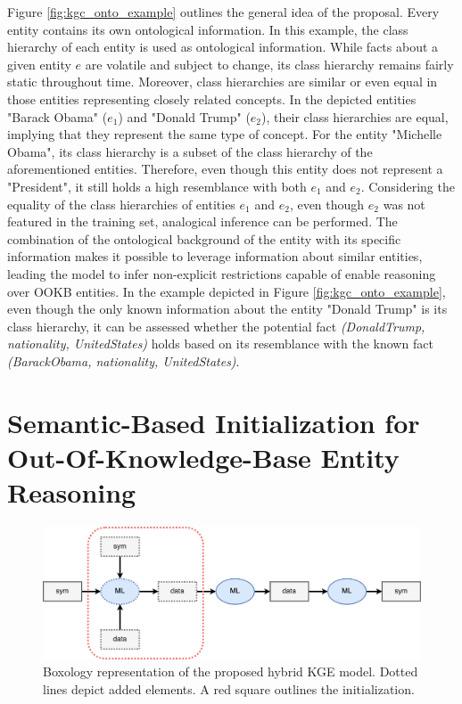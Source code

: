 Figure \ref{fig:kgc_onto_example} outlines the general idea of the proposal. Every entity contains its own ontological information. In this example, the class hierarchy of each entity is used as ontological information. While facts about a given entity $e$ are volatile and subject to change, its class hierarchy remains fairly static throughout time. Moreover, class hierarchies are similar or even equal in those entities representing closely related concepts. In the depicted entities "Barack Obama" ($e_1$) and "Donald Trump" ($e_2$), their class hierarchies are equal, implying that they represent the same type of concept. For the entity "Michelle Obama", its class hierarchy is a subset of the class hierarchy of the aforementioned entities. Therefore, even though this entity does not represent a "President", it still holds a high resemblance with both $e_1$ and $e_2$. Considering the equality of the class hierarchies of entities $e_1$ and $e_2$, even though $e_2$ was not featured in the training set, analogical inference can be performed. The combination of the ontological background of the entity with its specific information makes it possible to leverage information about similar entities, leading the model to infer non-explicit restrictions capable of enable reasoning over OOKB entities. In the example depicted in Figure \ref{fig:kgc_onto_example}, even though the only known information about the entity "Donald Trump" is its class hierarchy, it can be assessed whether the potential fact \textit{(DonaldTrump, nationality, UnitedStates)} holds based on its resemblance with the known fact \textit{(BarackObama, nationality, UnitedStates)}. 




\section{Semantic-Based Initialization for Out-Of-Knowledge-Base Entity Reasoning}
\begin{figure}
    \centering
    \includegraphics[width=\linewidth]{4_kbsintegrationdl/figures/boxology_krintodl.png}
    \caption{Boxology representation of the proposed hybrid KGE model. Dotted lines depict added elements. A red square outlines the initialization.}
    \label{fig:box_krintodl}
\end{figure} 

